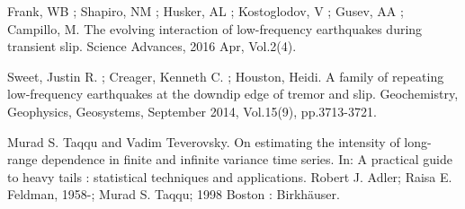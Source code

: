 \documentclass[workdone.tex]{subfiles}
\begin{document}
Frank, WB ; Shapiro, NM ; Husker, AL ; Kostoglodov, V ; Gusev, AA ; Campillo, M. The evolving interaction of low-frequency earthquakes during transient slip. Science Advances, 2016 Apr, Vol.2(4).

Sweet, Justin R. ; Creager, Kenneth C. ; Houston, Heidi. A family of repeating low‐frequency earthquakes at the downdip edge of tremor and slip. Geochemistry, Geophysics, Geosystems, September 2014, Vol.15(9), pp.3713-3721.

Murad S. Taqqu and Vadim Teverovsky. On estimating the intensity of long-range dependence in finite and infinite variance time series. In: A practical guide to heavy tails : statistical techniques and applications. Robert J. Adler; Raisa E. Feldman, 1958-; Murad S. Taqqu; 1998 Boston : Birkhäuser.
\end{document}
